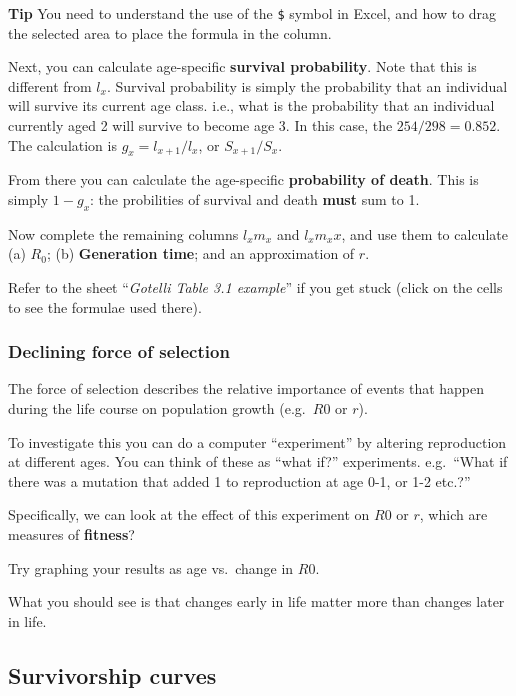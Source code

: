 \documentclass[
  a4paper]{book}
\begin{document}
\textbf{Tip} You need to understand the use of the \texttt{\$} symbol in Excel, and how to drag the selected area to place the formula in the column.

Next, you can calculate age-specific \textbf{survival probability}. Note that this is different from \(l_x\). Survival probability is simply the probability that an individual will survive its current age class. i.e., what is the probability that an individual currently aged 2 will survive to become age 3. In this case, the \(254/298 = 0.852\). The calculation is \(g_x = l_{x+1}/l_x\), or \(S_{x+1}/S_x\).

From there you can calculate the age-specific \textbf{probability of death}. This is simply \(1 - g_x\): the probilities of survival and death \textbf{must} sum to 1.

Now complete the remaining columns \(l_x m_x\) and \(l_x m_x x\), and use them to calculate (a) \(R_0\); (b) \textbf{Generation time}; and an approximation of \(r\).

Refer to the sheet ``\emph{Gotelli Table 3.1 example}'' if you get stuck (click on the cells to see the formulae used there).

\subsubsection{Declining force of selection}\label{declining-force-of-selection}

The force of selection describes the relative importance of events that happen during the life course on population growth (e.g.~\(R0\) or \(r\)).

To investigate this you can do a computer ``experiment'' by altering reproduction at different ages. You can think of these as ``what if?'' experiments. e.g.~``What if there was a mutation that added 1 to reproduction at age 0-1, or 1-2 etc.?''

Specifically, we can look at the effect of this experiment on \(R0\) or \(r\), which are measures of \textbf{fitness}?

Try graphing your results as age vs.~change in \(R0\).

What you should see is that changes early in life matter more than changes later in life.

\subsection{Survivorship curves}\label{survivorship-curves}
\end{document}
